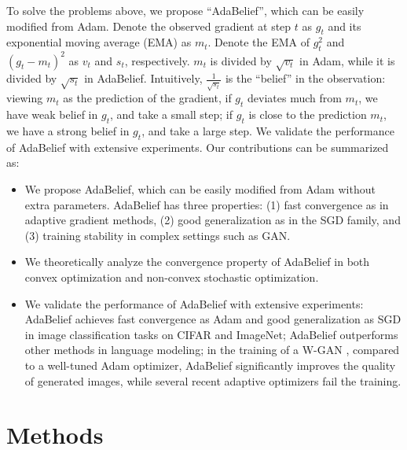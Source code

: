 \documentclass{article}
\begin{document}
To solve the problems above, we propose ``AdaBelief'', which can be easily modified from Adam.
Denote the observed gradient at step $t$  as $g_t$ and its exponential moving average (EMA) as $m_t$. Denote the EMA of $g_t^2$ and $(g_t - m_t)^2$ as $v_t$ and $s_t$, respectively. $m_t$ is divided by $\sqrt{v_t}$ in Adam, while it is divided by $\sqrt{s_t}$ in AdaBelief. 
Intuitively, $\frac{1}{\sqrt{s_t}}$ is the ``belief'' in the observation: viewing $m_t$ as the prediction of the gradient, if $g_t$ deviates much from $m_t$, we have weak belief in $g_t$, and take a small step; if $g_t$ is close to the prediction $m_t$, we have a strong belief in $g_t$, and take a large step. 
We validate the performance of AdaBelief with extensive experiments. Our contributions can be summarized as:
\begin{itemize}[topsep=0pt,parsep=0pt,partopsep=0pt, leftmargin=*]
\item We propose AdaBelief, which can be easily modified from Adam without extra parameters. AdaBelief has three properties: (1) fast convergence as in adaptive gradient methods, (2) good generalization as in the SGD family, and (3) training stability in complex settings such as GAN.
\item We theoretically analyze the convergence property of AdaBelief in both convex optimization and non-convex stochastic optimization.
\item We validate the performance of AdaBelief with extensive experiments: 
AdaBelief achieves fast convergence as Adam and good generalization as SGD in image classification tasks on CIFAR and ImageNet; 
AdaBelief outperforms other methods in language modeling; in the training of a W-GAN \cite{arjovsky2017wasserstein}, compared to a well-tuned Adam optimizer, AdaBelief significantly improves the quality of generated images, while several recent adaptive optimizers fail the training.
\end{itemize}
\section{Methods}
\label{sec:methods}
\end{document}

